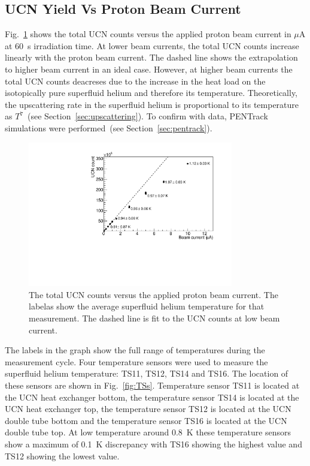 \subsection{UCN Yield Vs Proton Beam Current}
Fig.~\ref{fig:counts_vs_beam} shows the total UCN counts versus the
applied proton beam current in $\mu$A at 60~s irradiation time. At
lower beam currents, the total UCN counts increase linearly with the
proton beam current. The dashed line shows the extrapolation to higher
beam current in an ideal case. However, at higher beam currents the
total UCN counts deacreses due to the increase in the heat load on the
isotopically pure superfluid helium and therefore its
temperature. Theoretically, the upscattering rate in the superfluid
helium is proportional to its temperature as $T^7$~(see
Section~\ref{sec:upscattering}). To confirm with data, PENTrack
simulations were performed~(see Section~\ref{sec:pentrack}).



\begin{figure}[h!]
  \centering
  \includegraphics[width=0.8\textwidth]{UCNCounts_vs_Beam.pdf}
  \caption{The total UCN counts versus the applied proton beam
    current. The labelas show the average superfluid helium
    temperature for that measurement. The dashed line is fit to the
    UCN counts at low beam current. }
  \label{fig:counts_vs_beam}
\end{figure}



The labels in the graph show the full range of temperatures during the
measurement cycle. Four temperature sensors were used to measure the
superfluid helium temperature: TS11, TS12, TS14 and TS16. The location
of these sensors are shown in Fig.~\ref{fig:TSs}. Temperature sensor
TS11 is located at the UCN heat exchanger bottom, the temperature
sensor TS14 is located at the UCN heat exchanger top, the temperature
sensor TS12 is located at the UCN double tube bottom and the
temperature sensor TS16 is located at the UCN double tube top. At low
temperature around 0.8~K these temperature sensors show a maximum of
0.1~K discrepancy with TS16 showing the highest value and TS12 showing
the lowest value.



